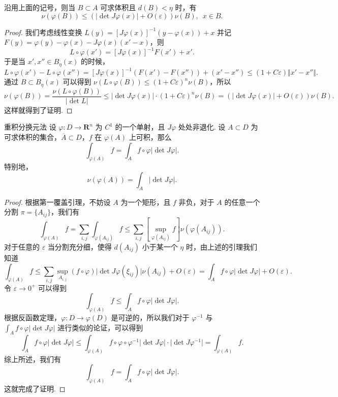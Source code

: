 \begin{lemma}{}{}
    沿用上面的记号，则当 $B\subset A$ 可求体积且 $d(B) < \eta$ 时，有 \[\nu(\varphi(B)) \leqslant \left(\lvert \det J\varphi(x)\rvert + O(\varepsilon)\right)\nu(B),\enspace x\in B.\]
\end{lemma}

\begin{proof}
    我们考虑线性变换 $L(y) = \left[J\varphi(x)\right]^{-1}(y - \varphi(x)) + x$ 并记 $F(y) = \varphi(y) - \varphi(x) - J\varphi(x)(x'-x)$，则 \[L\circ\varphi(x') = \left[J\varphi(x)\right]^{-1} F(x') + x'.\]
    于是当 $x', x''\in B_\eta(x)$ 的时候，\[L\circ\varphi(x') - L\circ\varphi(x'') = \left[J\varphi(x)\right]^{-1} (F(x') - F(x'')) + (x' - x'')\leqslant (1 + C\varepsilon)\Vert x' - x''\Vert.\]
    通过 $B\subset B_\eta(x)$ 可以得到 $\nu(L\circ\varphi(B)) \leqslant (1 + C\varepsilon)^n\nu(B)$，所以\[\nu(\varphi(B)) = \frac{\nu(L\circ\varphi(B))}{\lvert \det L\rvert}\leqslant \lvert \det J\varphi(x)\rvert \cdot (1 + C\varepsilon)^n\nu(B) = \left(\lvert \det J\varphi(x)\rvert + O(\varepsilon)\right)\nu(B).\]
    这样就得到了证明.
\end{proof}

\begin{theorem}{重积分换元法}{}
    设 $\varphi\colon D\to \mathbf{R}^n$ 为 $C^1$ 的一个单射，且 $J\varphi$ 处处非退化. 设 $A\subset D$ 为可求体积的集合，$\overline{A}\subset D$，$f$ 在 $\varphi(A)$ 上可积，那么\[\int_{\varphi(A)}f = \int_A f\circ \varphi\lvert \det J\varphi\rvert.\]
    特别地，\[\nu(\varphi(A)) = \int_A \lvert \det J\varphi\rvert.\]
\end{theorem}

\begin{proof}
    根据第一覆盖引理，不妨设 $A$ 为一个矩形，且 $f$ 非负，对于 $A$ 的任意一个分割 $\pi = \{A_{ij}\}$，我们有\[\int_{\varphi(A)}f = \sum_{i, j}\int_{\varphi(A_{ij})}f \leqslant \sum_{i, j}[\sup\limits_{\varphi(A_{ij})}f]\nu(\varphi(A_{ij})).\]
    对于任意的 $\varepsilon$ 当分割充分细，使得 $d(A_{ij})$ 小于某一个 $\eta$ 时，由上述的引理我们知道\[\int_{\varphi(A)}f \leqslant \sum_{i, j}\sup\limits_{A_{i, j}}(f\circ\varphi) \lvert\det J\varphi(\xi_{ij})\rvert \nu(A_{ij}) + O(\varepsilon) = \int_{A}f\circ\varphi\lvert\det J\varphi\rvert + O(\varepsilon).\]
    令 $\varepsilon\to0^+$ 可以得到\[\int_{\varphi(A)}f\leqslant \int_A f\circ\varphi\lvert\det J\varphi\rvert.\]
    根据反函数定理，$\varphi\colon D\to \varphi(D)$ 是可逆的，所以我们对于 $\varphi^{-1}$ 与 $\displaystyle\int_{A}f\circ\varphi\lvert\det J\varphi\rvert$ 进行类似的论证，可以得到 \[\int_{A}f \circ \varphi\lvert \det J\varphi\rvert \leqslant \int_{\varphi(A)}f\circ \varphi\circ\varphi^{-1}\lvert\det J\varphi\rvert \cdot\lvert \det J\varphi^{-1}\rvert  = \int_{\varphi(A)}f.\]
    综上所述，我们有\[\int_{\varphi(A)}f = \int_{A}f\circ\varphi\lvert\det J\varphi\rvert.\]这就完成了证明.
\end{proof}

